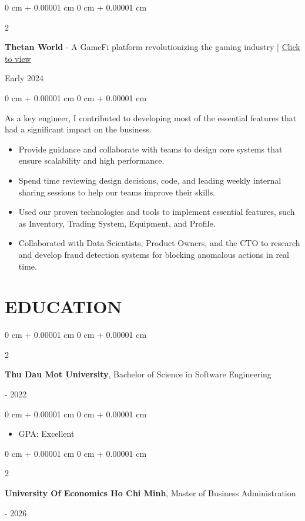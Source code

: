 \documentclass[10pt, letterpaper]{article}
\newenvironment{highlights}{
    \begin{itemize}[
        topsep=0.10 cm,
        parsep=0.10 cm,
        partopsep=0pt,
        itemsep=0pt,
        leftmargin=0 cm + 10pt
    ]
}{
    \end{itemize}
} %
\newenvironment{onecolentry}{
    \begin{adjustwidth}{
        0 cm + 0.00001 cm
    }{
        0 cm + 0.00001 cm
    }
}{
    \end{adjustwidth}
} %
\newenvironment{twocolentry}[2][]{
    \onecolentry
    \def\secondColumn{#2}
    \setcolumnwidth{\fill, 4.5 cm}
    \begin{paracol}{2}
}{
    \switchcolumn \raggedleft \secondColumn
    \end{paracol}
    \endonecolentry
} %
\begin{document}
    \vspace{0.20 cm}
    \begin{twocolentry}{
        Early 2024
    }
        \textbf{Thetan World} - A GameFi platform revolutionizing the gaming industry | \href{https://thetanworld.com}{Click to view}
    \end{twocolentry}

    \vspace{0.10 cm}
    \begin{onecolentry}
        As a key engineer, I contributed to developing most of the essential features that had a significant impact on the business.
        \begin{highlights}
            \item Provide guidance and collaborate with teams to design core systems that ensure scalability and high performance.
            \item Spend time reviewing design decisions, code, and leading weekly internal sharing sessions to help our teams improve their skills.
            \item Used our proven technologies and tools to implement essential features, such as Inventory, Trading System, Equipment, and Profile.
            \item Collaborated with Data Scientists, Product Owners, and the CTO to research and develop fraud detection systems for blocking anomalous actions in real time.
        \end{highlights}
    \end{onecolentry}

    \section{EDUCATION}

    \begin{twocolentry}{
        2018 - 2022
    }
        \textbf{Thu Dau Mot University}, Bachelor of Science in Software Engineering
    \end{twocolentry}

    \vspace{0.10 cm}
    \begin{onecolentry}
        \begin{highlights}
            \item GPA: Excellent
        \end{highlights}
    \end{onecolentry}

    \vspace{0.20 cm}
    \begin{twocolentry}{
        2024 - 2026
    }
        \textbf{University Of Economics Ho Chi Minh}, Master of Business Administration
    \end{twocolentry}
\end{document}
